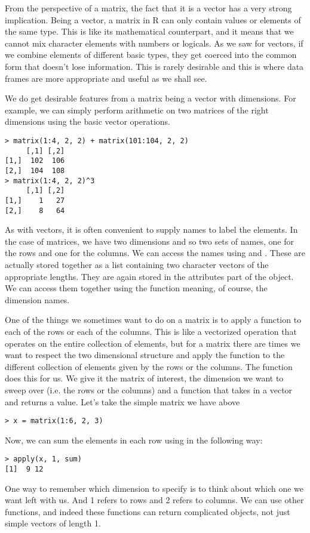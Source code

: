 From the perspective of a matrix, the fact that it is a vector has a
very strong implication. Being a vector, a matrix in R can only
contain values or elements of the same type. This is like its
mathematical counterpart, and it means that we cannot mix character
elements with numbers or logicals. As we saw for vectors, if we
combine elements of different basic types, they get coerced into the
common form that doesn't lose information. This is rarely desirable
and this is where data frames are more appropriate and useful as we
shall see.

We do get desirable features from a matrix being a vector with
dimensions. For example, we can simply perform arithmetic on two
matrices of the right dimensions using the basic vector operations.
\begin{verbatim}
> matrix(1:4, 2, 2) + matrix(101:104, 2, 2)
     [,1] [,2]
[1,]  102  106
[2,]  104  108
> matrix(1:4, 2, 2)^3
     [,1] [,2]
[1,]    1   27
[2,]    8   64
\end{verbatim}


As with vectors, it is often convenient to supply names to label the
elements. In the case of matrices, we have two dimensions and so two
sets of names, one for the rows and one for the columns. We can access
the names using  and . These
are actually stored together as a list containing two character
vectors of the appropriate lengths. They are again stored in the
attributes part of the object. We can access them together using the
 function meaning, of course, the dimension names.

One of the things we sometimes want to do on a matrix is to apply a
function to each of the rows or each of the columns. This is like a
vectorized operation that operates on the entire collection of
elements, but for a matrix there are times we want to respect the two
dimensional structure and apply the function to the different
collection of elements given by the rows or the columns. The function
 does this for us. We give it the matrix of interest,
the dimension we want to sweep over (i.e. the rows or the columns) and
a function that takes in a vector and returns a value. Let's take the
simple matrix we have above
\begin{verbatim}
> x = matrix(1:6, 2, 3)
\end{verbatim}
Now, we can sum the elements in each row using  in
the following way:
\begin{verbatim}
> apply(x, 1, sum)
[1]  9 12
\end{verbatim}
One way to remember which dimension to specify is to think about which
one we want left with us. And 1 refers to rows and 2 refers to
columns. We can use other functions, and indeed these functions can
return complicated objects, not just simple vectors of length 1.

